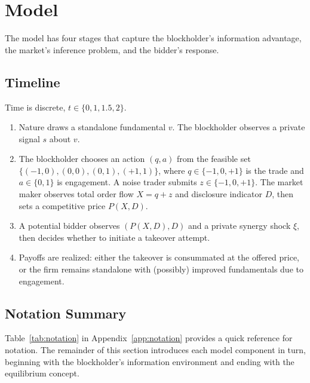 \section{Model}
\label{sec:model}

The model has four stages that capture the blockholder's information advantage, the market's inference problem, and the bidder's response.

\subsection{Timeline}

Time is discrete, $t \in \{0, 1, 1.5, 2\}$.

\begin{enumerate}[leftmargin=2em]
\item[$t=0$:] Nature draws a standalone fundamental $v$. The blockholder observes a private signal $s$ about $v$.
\item[$t=1$:] The blockholder chooses an action $(q,a)$ from the feasible set $\{(-1,0),(0,0),(0,1),(+1,1)\}$, where $q \in \{-1,0,+1\}$ is the trade and $a \in \{0,1\}$ is engagement. A noise trader submits $z \in \{-1, 0, +1\}$. The market maker observes total order flow $X = q + z$ and disclosure indicator $D$, then sets a competitive price $P(X, D)$.
\item[$t=1.5$:] A potential bidder observes $(P(X,D), D)$ and a private synergy shock $\xi$, then decides whether to initiate a takeover attempt.
\item[$t=2$:] Payoffs are realized: either the takeover is consummated at the offered price, or the firm remains standalone with (possibly) improved fundamentals due to engagement.
\end{enumerate}

\subsection{Notation Summary}

Table~\ref{tab:notation} in Appendix~\ref{app:notation} provides a quick reference for notation. The remainder of this section introduces each model component in turn, beginning with the blockholder's information environment and ending with the equilibrium concept.

